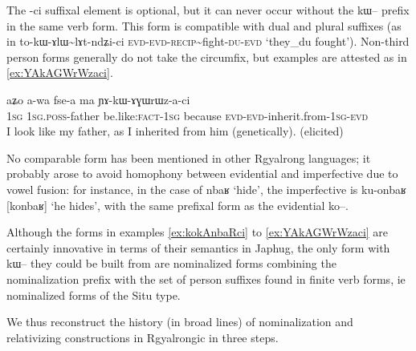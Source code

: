 \documentclass[oldfontcommands,oneside,a4paper,11pt]{article}
\newcommand{\ipa}[1]{{\phon #1}} %
\begin{document}
The \ipa{-ci} suffixal element is optional, but it can never occur without the \ipa{kɯ--} prefix in the same verb form. This form is compatible with dual and plural suffixes (as in \ipa{to-kɯ-ɤlɯ\textasciitilde{}lɤt-ndʑi-ci}  \textsc{evd-evd-recip}\textasciitilde{}fight-\textsc{du-evd} `they_{du} fought'). Non-third person forms generally do not take the circumfix, but examples are attested as in \ref{ex:YAkAGWrWzaci}.

\begin{exe}
\ex \label{ex:YAkAGWrWzaci}
\gll
\ipa{aʑo}  	\ipa{a-wa}  	\ipa{fse-a}  	\ipa{ma}  	\ipa{ɲɤ-kɯ-ɤɣɯrɯz-a-ci}  \\
\textsc{1sg} \textsc{1sg.poss}-father be.like:\textsc{fact-1sg} because  \textsc{evd-evd-}inherit.from-\textsc{1sg-evd} \\
\glt I look like my father, as I inherited from him (genetically). (elicited)
\end{exe}

No comparable form has been mentioned in other Rgyalrong languages; it probably arose to avoid homophony between evidential and imperfective due to vowel fusion: for instance, in the case of \ipa{nbaʁ} `hide', the imperfective is \ipa{ku-onbaʁ} [\ipa{konbaʁ}] `he hides', with the same prefixal form as the evidential \ipa{ko--}.

Although the forms in examples  \ref{ex:kokAnbaRci} to \ref{ex:YAkAGWrWzaci} are certainly innovative in terms of their semantics in Japhug, the only form with \ipa{kɯ--} they could be built from are nominalized forms combining the nominalization prefix with the set of person suffixes found in finite verb forms, ie nominalized forms of the Situ type.

We thus reconstruct the history (in broad lines) of nominalization and relativizing constructions in Rgyalrongic in three steps.
\end{document}
